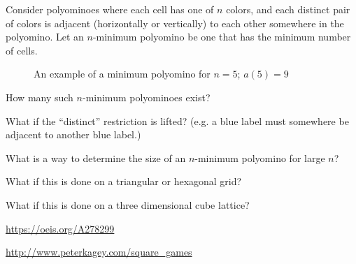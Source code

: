 \documentclass{article}
\begin{document}
Consider polyominoes where each cell has one of $n$ colors, and
each distinct pair of colors is adjacent (horizontally or vertically) to each other
somewhere in the polyomino. Let an $n$-minimum polyomino be one that has the
minimum number of cells.

\begin{figure}[!h]
  \centering
  \caption{An example of a minimum polyomino for $n = 5$; $a(5)=9$}
\end{figure}

\begin{question}
  How many such $n$-minimum polyominoes exist?
\end{question}
\begin{related}
  \item What if the ``distinct'' restriction is lifted?
    (e.g. a blue label must somewhere be adjacent to another blue label.)
  \item What is a way to determine the size of an $n$-minimum polyomino for
    large $n$?
  \item What if this is done on a triangular or hexagonal grid?
  \item What if this is done on a three dimensional cube lattice?
\end{related}

\begin{references}
  \item \url{https://oeis.org/A278299}
  \item \url{http://www.peterkagey.com/square_games}
\end{references}
\end{document}
